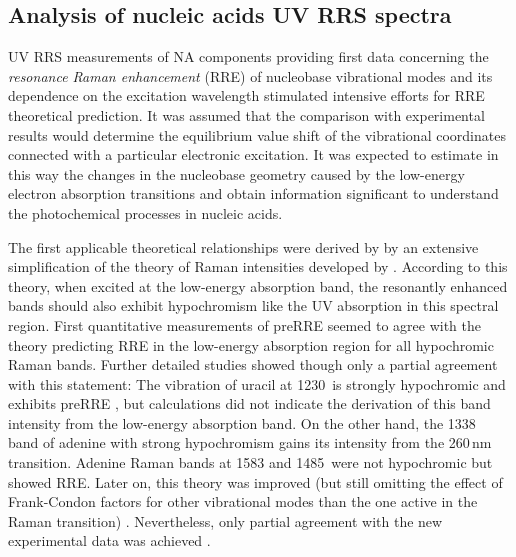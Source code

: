 \subsection{Analysis of nucleic acids UV RRS spectra}

UV RRS measurements of NA components providing first data concerning the
\emph{resonance Raman enhancement} (RRE) of nucleobase vibrational modes and
its dependence on the excitation wavelength stimulated intensive efforts for
RRE theoretical prediction.
It was assumed that the comparison with experimental results would determine
the equilibrium value shift of the vibrational coordinates
connected with a particular electronic excitation.
It was expected to estimate in this way the changes in the nucleobase geometry
caused by the low-energy electron absorption transitions and obtain
information significant to understand the photochemical processes in nucleic
acids.

The first applicable theoretical relationships were derived by
\textcite{Peticolas1970}
by an extensive simplification of the theory of Raman intensities developed by
\textcite{Albrecht1961}.
According to this theory, when excited at the low-energy absorption band,
the resonantly enhanced bands should also exhibit hypochromism like the UV
absorption in this spectral region.
First quantitative measurements of preRRE
\parencite{Kalantar1972}
seemed to agree with the theory predicting RRE in the low-energy absorption
region for all hypochromic Raman bands.
Further detailed studies showed though only a partial agreement with this
statement:
The vibration of uracil at 1230\,\icm{} is strongly hypochromic
\parencite{%
	Small1971,%
	Small1971a%
}
and exhibits preRRE
\parencite{Tsuboi1971},
but calculations did not indicate the derivation of this band intensity from
the low-energy absorption band.
On the other hand, the 1338\,\icm{} band of adenine with strong hypochromism
\parencite{%
	Aylward1970,%
	Lafleur1972,%
	Small1971%
}
gains its intensity from the 260\,nm transition.
Adenine Raman bands at 1583 and 1485\,\icm{} were not hypochromic but showed
RRE.
Later on, this theory was improved (but still omitting the effect of
Frank-Condon factors for other vibrational modes than the one active in the
Raman transition)
\parencite{%
	Blazej1977,%
	Warshel1977a%
}.
Nevertheless, only partial agreement with the new experimental data was achieved
\parencite{%
	Peticolas1979,%
	Peticolas1980%
}.

